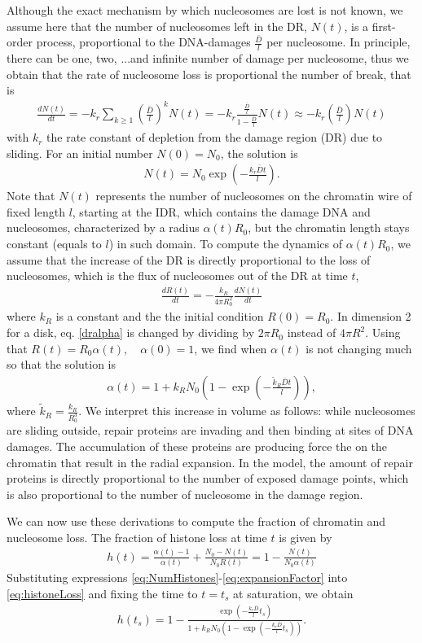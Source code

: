 \documentclass[12pt]{article}
\newcommand{\beq}{\begin{eqnarray}}
\newcommand{\eeq}{\end{eqnarray}}
\begin{document}
Although the exact mechanism by which nucleosomes are lost is not known, we assume here that the number of nucleosomes left in the DR, $N(t)$, is a first-order process, proportional to the DNA-damages $\frac{\bar{D}}{l}$ per nucleosome. In principle, there can be one, two, ...and infinite number of damage per nucleosome, thus we obtain that the rate of nucleosome loss is proportional the number of break, that is 
\beq
\frac{dN(t)}{dt} = -k_r\sum_{k\geq 1} (\frac{\bar{D}}{l})^kN(t)=-k_r \frac{\frac{\bar{D}}{l}}{1-\frac{\bar{D}}{l}}N(t) \approx -k_r (\frac{\bar{D}}{l})N(t)
\eeq
with $k_r$ the rate constant of depletion from the damage region (DR) due to sliding. For an initial number $N(0) = N_0$, the solution is
\beq\label{eq:NumHistones}
N(t) = N_0\exp(-\frac{k_r\bar{D}t}{l}).
\eeq
Note that $N(t)$ represents the number of nucleosomes on the chromatin wire of fixed length $l$, starting at the IDR, which contains the damage DNA and nucleosomes, characterized by a radius $\alpha(t)R_0$, but the chromatin length stays constant (equals to $l$) in such domain. To compute the dynamics of $\alpha(t)R_0$, we assume that the increase of the DR is directly proportional to the loss of nucleosomes, which is the flux of nucleosomes out of the DR at time $t$,
\beq\label{dralpha}
\frac{dR(t)}{dt}=-\frac{k_R}{4\pi R_0^2}\frac{dN(t)}{dt}
\eeq
where $k_R $ is a constant and the the initial condition $R(0)=R_0$. In dimension 2 for a disk, eq. \ref{dralpha} is changed by dividing by $2\pi R_0$ instead of $4\pi R^2$.  Using that $R(t)=R_0 \alpha (t), \quad \alpha(0)=1$, we find when $\alpha(t)$ is not changing much so that the solution is
\beq\label{eq:expansionFactor}
\alpha(t) = 1+k_RN_0(1-\exp(-\frac{\tilde k_R\bar{D}t}{l})),
\eeq
where $\tilde k_R=\frac{k_R}{R_0^3}$. We interpret this increase in volume as follows: while nucleosomes are sliding outside, repair proteins are invading and then binding at sites of DNA damages. The accumulation of these proteins are producing force the on the chromatin that result in the radial expansion. In the model, the amount of repair proteins is directly proportional to the number of exposed damage points, which is also proportional to the number of nucleosome in the damage region.

We can now use these derivations to compute the fraction of chromatin and nucleosome loss. The fraction of histone loss at time $t$ is given by
\beq\label{eq:histoneLoss}
h(t) = \frac{\alpha(t)-1}{\alpha(t)} +\frac{N_0-N(t)}{N_0R(t)}=1-\frac{N(t)}{N_0\alpha(t)}
\eeq
Substituting expressions \ref{eq:NumHistones}-\ref{eq:expansionFactor} into \ref{eq:histoneLoss} and fixing the time to $t=t_s$ at saturation, we obtain
\beq\label{eq:totalHistoneLoss}
h(t_s)=1-\frac{\exp(-\frac{k_r\bar{D}}{l}t_s)}{ 1+k_RN_0(1-\exp(-\frac{k_r\bar{D}}{l}t_s))}.
\eeq
\end{document}
